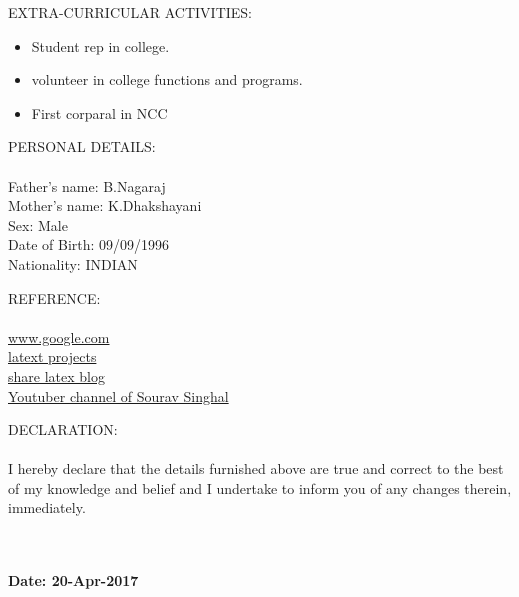 \documentclass[14pt,a4paper]{article}
\begin{document}
\begin{paragraph}{\large EXTRA-CURRICULAR ACTIVITIES:\\}
\begin{itemize}
\item Student rep in college.
\item volunteer in college functions and programs.
\item First corparal in NCC
\end{itemize}
\end{paragraph}

\begin{paragraph}{\large PERSONAL DETAILS: \\}
\hfill\\
Father's name: B.Nagaraj\\
Mother's name: K.Dhakshayani\\
Sex: Male\\
Date of Birth: 09/09/1996\\
Nationality: INDIAN\\
\end{paragraph}

\begin{paragraph}{\large REFERENCE:\\}
\hfill\\
\href{www.google.com}{www.google.com\\}
\href{http://www.latex-project.org/}{latext projects\\}
\href{https://www.sharelatex.com/learn/Multiple_columns}{share latex blog\\}
\href{https://www.youtube.com/channel/UC7Bbc2pxojIxRglXbm_mC2g}{Youtuber channel of Sourav Singhal\\}
\end{paragraph}

\begin{paragraph}{\large DECLARATION:\\}
\hfill\\
 I hereby declare that the details furnished above are true and correct to the best of my knowledge
and belief and I undertake to inform you of any changes therein, immediately.\\
\end{paragraph}
\hfill\\
\hfill\\
\textbf{\large Date: 20-Apr-2017\\}
\end{document}
